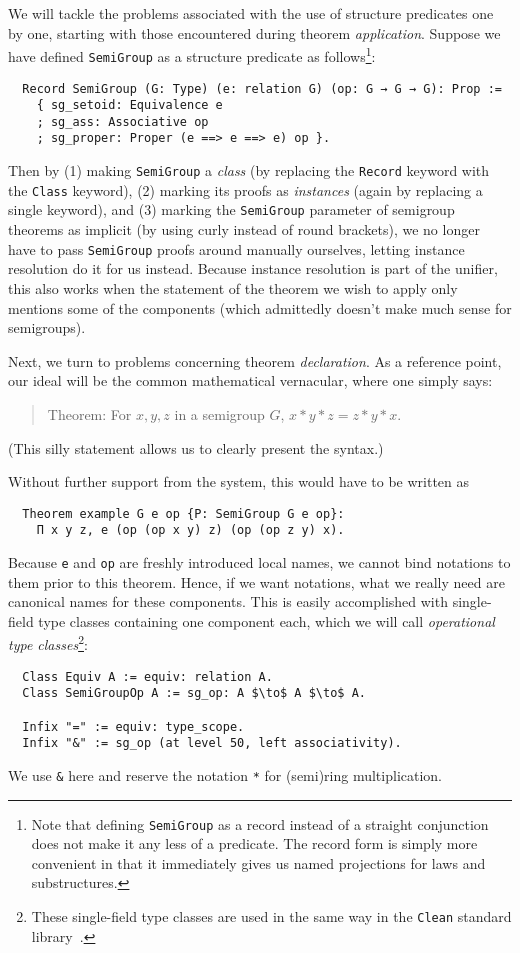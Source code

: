\documentclass[a4paper,10pt,runningheads]{llncs}
\begin{document}
We will tackle the problems associated with the use of structure predicates one by one, starting with those encountered during theorem \emph{application}. Suppose we have defined \lstinline|SemiGroup| as a structure predicate as follows\footnote{Note that defining \lstinline|SemiGroup| as a record instead of a straight conjunction does not make it any less of a predicate. The record form is simply more convenient in that it immediately gives us named projections for laws and substructures.}:
\begin{lstlisting}
  Record SemiGroup (G: Type) (e: relation G) (op: G → G → G): Prop :=
    { sg_setoid: Equivalence e
    ; sg_ass: Associative op
    ; sg_proper: Proper (e ==> e ==> e) op }.
\end{lstlisting}
Then by (1) making \lstinline|SemiGroup| a \emph{class} (by replacing the \lstinline|Record| keyword with the \lstinline|Class| keyword), (2) marking its proofs as \emph{instances} (again by replacing a single keyword), and (3) marking the \lstinline|SemiGroup| parameter of semigroup theorems as implicit (by using curly instead of round brackets), we no longer have to pass \lstinline|SemiGroup| proofs around manually ourselves, letting instance resolution do it for us instead. Because instance resolution is part of the unifier, this also works when the statement of the theorem we wish to apply only mentions some of the components (which admittedly doesn't make much sense for semigroups).

Next, we turn to problems concerning theorem \emph{declaration}. As a reference point, our ideal will be the common mathematical vernacular, where one simply says:
\begin{quote}
Theorem: For $x, y, z$ in a semigroup $G$, $x * y * z = z * y * x$.
\end{quote}
(This silly statement allows us to clearly present the syntax.)

Without further support from the system, this would have to be written as
\begin{lstlisting}
  Theorem example G e op {P: SemiGroup G e op}:
    Π x y z, e (op (op x y) z) (op (op z y) x).
\end{lstlisting}
Because \lstinline|e| and \lstinline{op} are freshly introduced local names, we cannot bind notations to them prior to this theorem. Hence, if we want notations, what we really need are canonical names for these components. This is easily accomplished with single-field type classes containing one component each, which we will call \emph{operational type classes}\footnote{These single-field type classes are used in the same way in the \lstinline|Clean| standard library~\cite{clean}.}:
\begin{lstlisting}
  Class Equiv A := equiv: relation A.
  Class SemiGroupOp A := sg_op: A $\to$ A $\to$ A.

  Infix "=" := equiv: type_scope.
  Infix "&" := sg_op (at level 50, left associativity).
\end{lstlisting}
We use \lstinline|&| here and reserve the notation \lstinline|*| for (semi)ring multiplication.
\end{document}
